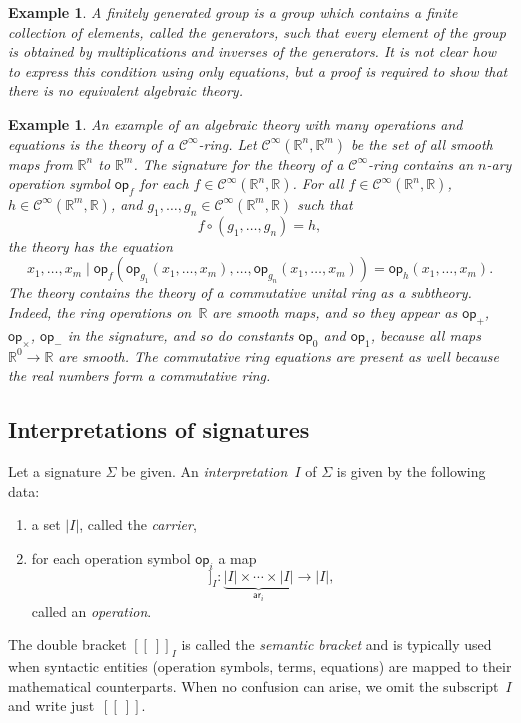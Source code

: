 \documentclass{amsart}
\newcommand{\RR}{\mathbb{R}} %
\newcommand{\carrier}[1]{|#1|} %
\newcommand{\op}[1]{\mathsf{op}_{#1}} %
\newcommand{\arity}[1]{\mathsf{ar}_{#1}} %
\newcommand{\Cinfty}{\mathcal{C}^\infty}
\newcommand{\sem}[1]{[\![#1]\!]} %
\newtheorem{example}[definition]{Example}
\begin{document}
\begin{example}
  \label{ex:finitely-generated-group}
  A \emph{finitely generated group} is a group which contains a finite collection of
  elements, called the \emph{generators}, such that every element of the group is obtained
  by multiplications and inverses of the generators. It is not clear how to express this
  condition using only equations, but a proof is required to show that there is no
  equivalent algebraic theory.
\end{example}

\begin{example}
  \label{ex:Cinfty-theory}
  An example of an algebraic theory with many operations and equations is the theory of a
  $\Cinfty$-ring. Let $\Cinfty(\RR^n, \RR^m)$ be the set of all smooth maps from $\RR^n$
  to $\RR^m$. The signature for the theory of a $\Cinfty$-ring contains an $n$-ary
  operation symbol $\op{f}$ for each $f \in \Cinfty(\RR^n, \RR)$. For all
  $f \in \Cinfty(\RR^n, \RR)$, $h \in \Cinfty(\RR^m, \RR)$, and
  $g_1, \ldots, g_n \in \Cinfty(\RR^m, \RR)$ such that
  \begin{equation*}
    f \circ (g_1, \ldots, g_n) = h,
  \end{equation*}
  the theory has the equation
  \begin{equation*}
    x_1, \ldots, x_m \mid
    \op{f} (\op{g_1}(x_1, \ldots, x_m), \ldots, \op{g_n}(x_1, \ldots, x_m)) =
    \op{h}(x_1, \ldots, x_m).
  \end{equation*}
  The theory contains the theory of a commutative unital ring as a subtheory. Indeed,
  the ring operations on~$\RR$ are smooth maps, and so they appear as $\op{+}$,
  $\op{\times}$, $\op{-}$ in the signature, and so do constants $\op{0}$ and $\op{1}$,
  because all maps $\RR^0 \to \RR$ are smooth. The commutative ring equations are present
  as well because the real numbers form a commutative ring.
\end{example}


\subsection{Interpretations of signatures}
\label{sec:interp-of-sign}

Let a signature $\Sigma$ be given. An \emph{interpretation~$I$} of $\Sigma$ is given by
the following data:
%
\begin{enumerate}
\item a set $\carrier{I}$, called the \emph{carrier},
\item for each operation symbol $\op{i}$ a map
  \begin{equation*}
    \sem{\op{i}}_I : \underbrace{\carrier{I} \times \cdots \times \carrier{I}}_{\arity{i}} \to \carrier{I},
  \end{equation*}
  called an \emph{operation}.
\end{enumerate}
%
The double bracket $\sem{{\ }}_I$ is called the \emph{semantic bracket} and is typically
used when syntactic entities (operation symbols, terms, equations) are mapped to
their mathematical counterparts. When no confusion can arise, we omit the subscript~$I$
and write just~$\sem{{\ }}$.
\end{document}

